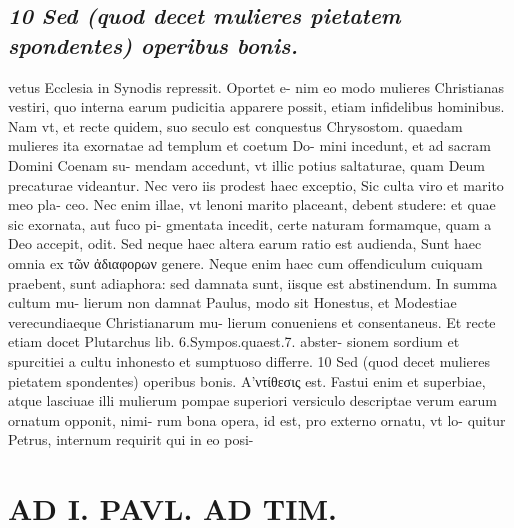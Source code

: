 \documentclass{article}
\begin{document}
\begin{pages}
\subsection*{\textit{10 Sed (quod decet mulieres pietatem spondentes) operibus bonis.}}vetus Ecclesia in Synodis repressit. Oportet e- nim eo modo mulieres Christianas vestiri, quo interna earum pudicitia apparere possit, etiam infidelibus hominibus. Nam vt, et recte quidem, suo seculo est conquestus Chrysostom. quaedam mulieres ita exornatae ad templum et coetum Do- mini incedunt, et ad sacram Domini Coenam su- mendam accedunt, vt illic potius saltaturae, quam Deum precaturae videantur. Nec vero iis prodest haec exceptio, Sic culta viro et marito meo pla- ceo. Nec enim illae, vt lenoni marito placeant, debent studere: et quae sic exornata, aut fuco pi- gmentata incedit, certe naturam formamque, quam a Deo accepit, odit. Sed neque haec altera earum ratio est audienda, Sunt haec omnia ex τῶν ἀδιαφορων genere. Neque enim haec cum offendiculum cuiquam praebent, sunt adiaphora: sed damnata sunt, iisque est abstinendum. In summa cultum mu- lierum non damnat Paulus, modo sit Honestus, et Modestiae verecundiaeque Christianarum mu- lierum conueniens et consentaneus. Et recte etiam docet Plutarchus lib. 6.Sympos.quaest.7. abster- sionem sordium et spurcitiei a cultu inhonesto et sumptuoso differre. 10 Sed (quod decet mulieres pietatem spondentes) operibus bonis. A'ντίθεσις est. Fastui enim et superbiae, atque lasciuae illi mulierum pompae superiori versiculo descriptae verum earum ornatum opponit, nimi- rum bona opera, id est, pro externo ornatu, vt lo- quitur Petrus, internum requirit qui in eo posi-  \pend
\section*{AD I. PAVL. AD TIM. }
\marginpar{[ p.82 ]}\pstart {}
{}

\end{pages}
\end{document}
